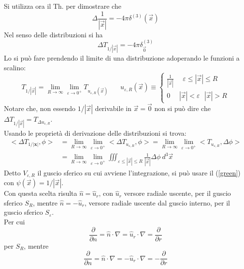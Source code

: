 \documentclass[twoside]{article}
\renewcommand{\vec}[1]{\textbf{#1}}
\begin{document}
Si utilizza ora il Th. per dimostrare che 
\begin{equation}
    \Delta \frac{1}{|\Vec{x}|}=-4\pi \delta^{(3)}(\Vec{x})
\end{equation}
Nel senso delle distribuzioni si ha 
\begin{equation}
    \Delta T_{1/|\Vec{x}|}=-4\pi \delta^{(3)}_{\Vec{0}}
\end{equation}
Lo si può fare prendendo il limite di una distribuzione adoperando le funzioni a scalino:
\begin{equation}
    T_{1/|\Vec{x}|}=\lim_{R\to \infty} \lim_{\varepsilon \to 0^+}T_{u_{\varepsilon,R}(\Vec{x})} \ \ \ \ \ \ \ \ u_{\varepsilon,R}(\Vec{x})\equiv \left\{ \begin{array}{lr}
         \frac{1}{|\Vec{x}|} \ \ \ \ \ \ \varepsilon\le |\Vec{x}|\le R  \\
         0 \ \ \ \ \ \ |\Vec{x}|<\varepsilon \ \ \ |\Vec{x}|>R
    \end{array}\right.
\end{equation}
Notare che, non essendo $1/|\Vec{x}|$ derivabile in $\Vec{x}=\Vec{0}$ non si può dire che $\Delta T_{1/|\Vec{x}|}=T_{\Delta u_{\varepsilon, R}}$.
\\
Usando le proprietà di derivazione delle distribuzioni si trova:
\begin{align}
    <\Delta T_{1/|\vec{x}|},\phi>&=\lim_{R\to \infty}\lim_{\varepsilon \to 0^+}<\Delta T_{u_{\varepsilon,R}},\phi>=\lim_{R\to \infty}\lim_{\varepsilon \to 0^+}<T_{u_{\varepsilon,R}},\Delta \phi>\\&=\lim_{R\to \infty}\lim_{\varepsilon \to 0^+}\iiint_{\varepsilon\le |\Vec{x}|\le R}\frac{1}{|\Vec{x}|}\Delta \phi \ d^3\Vec{x}
\end{align}
Detto $V_{\varepsilon,R}$ il guscio sferico su cui avviene l'integrazione, si può usare il (\ref{green}) con $\psi(\Vec{x})=1/|\Vec{x}|$.
\\
Con questa scelta risulta $\hat{n}=\hat{u}_r$, con $\hat{u}_r$ versore radiale uscente, per il guscio sferico $S_R$, mentre $\hat{n}=-\hat{u}_r$, versore radiale uscente dal guscio interno, per il guscio sferico $S_\varepsilon$.
\\
Per cui
\begin{equation*}
    \frac{\partial}{\partial n}=\hat{n}\cdot \nabla=\hat{u}_r\cdot \nabla=\frac{\partial}{\partial r}
\end{equation*}
per $S_R$, mentre
\begin{equation*}
    \frac{\partial}{\partial n}=\hat{n}\cdot \nabla=-\hat{u}_r\cdot \nabla=-\frac{\partial}{\partial r}
\end{equation*}
\end{document}
